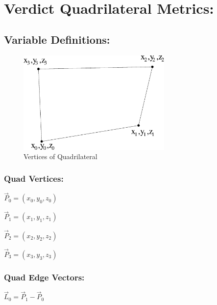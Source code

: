 \documentclass[12pt]{article}
\begin{document}
\section*{Verdict Quadrilateral Metrics:}

\subsection*{Variable Definitions:}

\begin{figure}[htb]
  \begin{center}
    \includegraphics[height=2.0in]{quad.eps}
    \caption{Vertices of Quadrilateral}
    \label{fig:blank}
  \end{center}
\end{figure}

\subsubsection*{Quad Vertices:}
\begin{center}
$\vec P_0 = (x_0, y_0, z_0)$
\end{center}

\begin{center}
$\vec P_1 = (x_1, y_1, z_1)$
\end{center}

\begin{center}
$\vec P_2 = (x_2, y_2, z_2)$
\end{center}

\begin{center}
$\vec P_3 = (x_3, y_3, z_3)$
\end{center}

\subsubsection*{Quad Edge Vectors:}

\begin{center}
$\vec L_0 = \vec P_1 - \vec P_0 $
\end{center}
\end{document}
